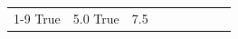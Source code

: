\begin{table}[H]
\begin{tabular}{lllrlllll}
\cline{1-9}
True & 5.0%
\cline{1-9}
True & 7.5%

\end{tabular}
\end{table}
